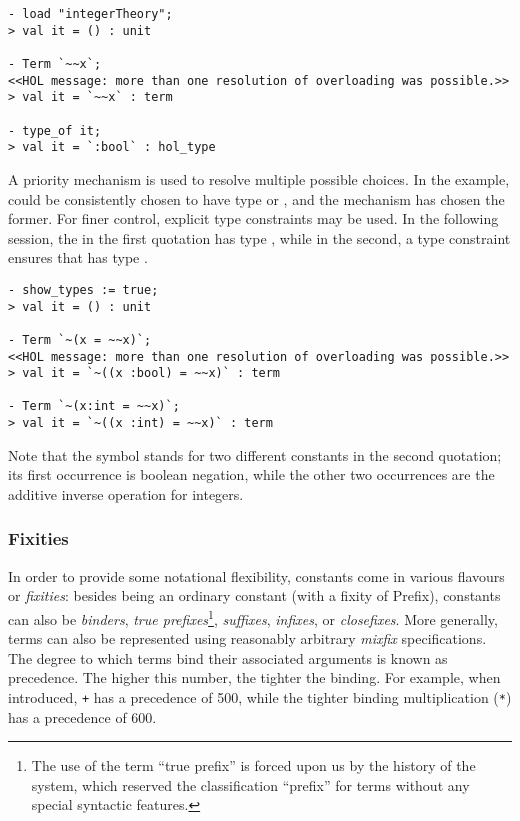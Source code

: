 \setcounter{sessioncount}{0}
\begin{session}
\begin{verbatim}
- load "integerTheory";
> val it = () : unit

- Term `~~x`;
<<HOL message: more than one resolution of overloading was possible.>>
> val it = `~~x` : term

- type_of it;
> val it = `:bool` : hol_type
\end{verbatim}
\end{session}

A priority mechanism is used to resolve multiple possible choices. In
the example, \holtxt{\~{}} could be consistently chosen to have type
 or , and the
mechanism has chosen the former. For finer control, explicit type
constraints may be used. In the following session, the
 in the first quotation has type ,
while in the second, a type constraint ensures that  has
type .

\begin{session}
\begin{verbatim}
- show_types := true;
> val it = () : unit

- Term `~(x = ~~x)`;
<<HOL message: more than one resolution of overloading was possible.>>
> val it = `~((x :bool) = ~~x)` : term

- Term `~(x:int = ~~x)`;
> val it = `~((x :int) = ~~x)` : term
\end{verbatim}
\end{session}

Note that the symbol \holtxt{\~{}} stands for two different constants in
the second quotation; its first occurrence is boolean negation, while
the other two occurrences are the additive inverse operation for
integers.

\subsubsection{Fixities}
\label{sec:parseprint:fixities}

In order to provide some notational flexibility, constants come in
various flavours or {\it fixities}: besides being an ordinary constant
(with a fixity of {\sf Prefix}), constants can also be {\it binders},
{\it true prefixes}\footnote{The use of the term ``true prefix'' is
forced upon us by the history of the system, which reserved the
classification ``prefix'' for terms without any special syntactic
features.}, {\it suffixes}, {\it infixes}, or {\it closefixes}.  More
generally, terms can also be represented using reasonably arbitrary
{\it mixfix} specifications.  The degree to which terms bind their
associated arguments is known as precedence.  The higher this number,
the tighter the binding.  For example, when introduced, \verb-+- has a
precedence of 500, while the tighter binding multiplication (\verb+*+)
has a precedence of 600.

